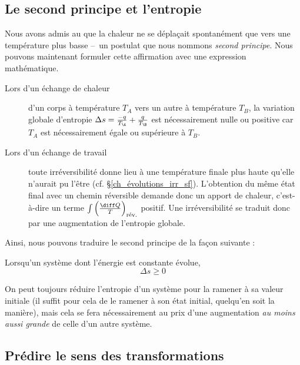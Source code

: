 		

	\subsection{Le second principe et l’entropie}

		Nous avons admis au \courssept que la chaleur ne se déplaçait spontanément que vers une température plus basse --\ un postulat que nous nommons \textit{second principe}. Nous pouvons maintenant formuler cette affirmation avec une expression mathématique.
	
		\begin{description}
			\item[Lors d’un échange de chaleur] d’un corps à température $T_A$ vers un autre à température $T_B$, la variation globale d’entropie $\Delta s = \frac{-q}{T_\A} + \frac{q}{T_\B }$ est nécessairement nulle ou positive car $T_A$ est nécessairement égale ou supérieure à $T_B$.
			
			\item[Lors d’un échange de travail] toute irréversibilité donne lieu à une température finale plus haute qu’elle n’aurait pu l’être (cf. \S\ref{ch_évolutions_irr_sf}). L’obtention du même état final avec un chemin réversible demande donc un apport de chaleur, c’est-à-dire un terme $\int \left(\frac{\diff Q}{T}\right)_\text{rév.}$ positif. Une irréversibilité se traduit donc par une augmentation de l’entropie globale.
			
		\end{description}

		Ainsi, nous pouvons traduire le second principe de la façon suivante :
			
		\begin{trucimportant}
			Lorsqu’un système dont l’énergie est constante évolue,
				\begin{equation}
					\Delta s \geqslant 0
					\label{eq_augmentation_entropie}
				\end{equation}
		\end{trucimportant}

		On peut toujours réduire l’entropie d’un système pour la ramener à sa valeur initiale (il suffit pour cela de le ramener à son état initial, quelqu’en soit la manière), mais cela se fera nécessairement au prix d’une augmentation \emph{au moins aussi grande} de celle d’un autre système.

	\subsection{Prédire le sens des transformations}
	
